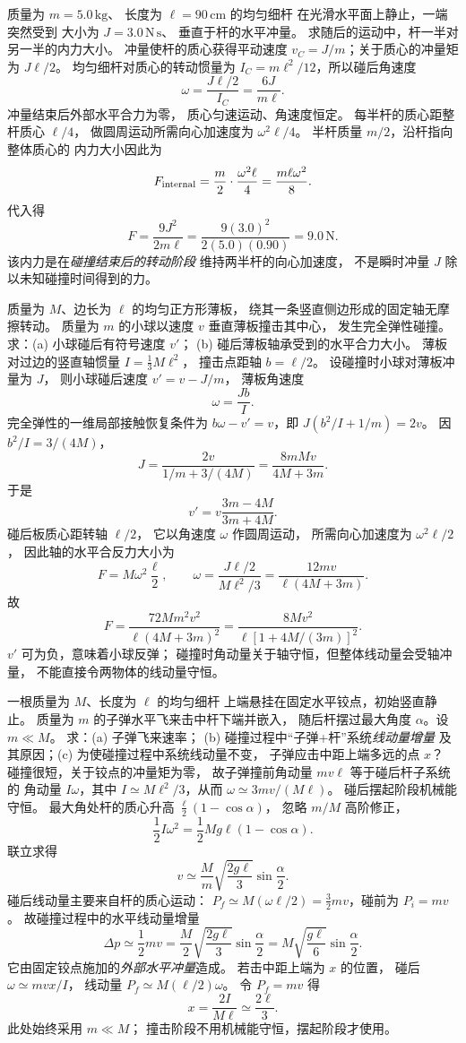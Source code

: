质量为 $m=5.0\,\mathrm{kg}$、
长度为 $\ell=90\,\mathrm{cm}$ 的均匀细杆
在光滑水平面上静止，一端突然受到
大小为 $J=3.0\,\mathrm{N\,s}$、
垂直于杆的水平冲量。
求随后的运动中，杆一半对另一半的内力大小。
\exsolution
冲量使杆的质心获得平动速度
$v_C=J/m$；关于质心的冲量矩为
$J\ell/2$。
均匀细杆对质心的转动惯量为
$I_C=m\ell^2/12$，所以碰后角速度
\[
\omega=\frac{J\ell/2}{I_C}
=\frac{6J}{m\ell}.
\]
冲量结束后外部水平合力为零，
质心匀速运动、角速度恒定。
每半杆的质心距整杆质心 $\ell/4$，
做圆周运动所需向心加速度为
$\omega^2\ell/4$。
半杆质量 $m/2$，沿杆指向整体质心的
内力大小因此为
\[
F_{\rm internal}=\frac m2\cdot\frac{\omega^2\ell}{4}
=\frac{m\ell\omega^2}{8}.
\]
代入得
\[
\boxed{F=\frac{9J^2}{2m\ell}
=\frac{9(3.0)^2}{2(5.0)(0.90)}
=9.0\,\mathrm N}.
\]
\excheck 该内力是在\emph{碰撞结束后的转动阶段}
维持两半杆的向心加速度，
不是瞬时冲量 $J$ 除以未知碰撞时间得到的力。

质量为 $M$、边长为 $\ell$ 的均匀正方形薄板，
绕其一条竖直侧边形成的固定轴无摩擦转动。
质量为 $m$ 的小球以速度 $v$ 垂直薄板撞击其中心，
发生完全弹性碰撞。
求：(a) 小球碰后有符号速度 $v'$；
(b) 碰后薄板轴承受到的水平合力大小。
\exsolution
薄板对过边的竖直轴惯量
$I=\frac13M\ell^2$，
撞击点距轴 $b=\ell/2$。
设碰撞时小球对薄板冲量为 $J$，
则小球碰后速度 $v'=v-J/m$，
薄板角速度
\[
\omega=\frac{Jb}{I}.
\]
完全弹性的一维局部接触恢复条件为
$b\omega-v'=v$，即
$J(b^2/I+1/m)=2v$。
因 $b^2/I=3/(4M)$，
\[
J=\frac{2v}{1/m+3/(4M)}
=\frac{8mMv}{4M+3m}.
\]
于是
\[
\boxed{v'=v\frac{3m-4M}{3m+4M}}.
\]
碰后板质心距转轴 $\ell/2$，
它以角速度 $\omega$ 作圆周运动，
所需向心加速度为 $\omega^2\ell/2$，
因此轴的水平合反力大小为
\[
F=M\omega^2\frac\ell2,\qquad
\omega=\frac{J\ell/2}{M\ell^2/3}
=\frac{12mv}{\ell(4M+3m)}.
\]
故
\[
\boxed{F=\frac{72Mm^2v^2}{\ell(4M+3m)^2}
=\frac{8Mv^2}{\ell[1+4M/(3m)]^2}}.
\]
\excheck $v'$ 可为负，意味着小球反弹；
碰撞时角动量关于轴守恒，但整体线动量会受轴冲量，
不能直接令两物体的线动量守恒。

一根质量为 $M$、长度为 $\ell$ 的均匀细杆
上端悬挂在固定水平铰点，初始竖直静止。
质量为 $m$ 的子弹水平飞来击中杆下端并嵌入，
随后杆摆过最大角度 $\alpha$。设 $m\ll M$。
求：(a) 子弹飞来速率；
(b) 碰撞过程中“子弹+杆”系统\emph{线动量增量}
及其原因；(c) 为使碰撞过程中系统线动量不变，
子弹应击中距上端多远的点 $x$？
\exsolution
碰撞很短，关于铰点的冲量矩为零，
故子弹撞前角动量 $mv\ell$ 等于碰后杆子系统的
角动量 $I\omega$，其中
$I\simeq M\ell^2/3$，从而
$\omega\simeq3mv/(M\ell)$。
碰后摆起阶段机械能守恒。
最大角处杆的质心升高
$\frac\ell2(1-\cos\alpha)$，
忽略 $m/M$ 高阶修正，
\[
\frac12I\omega^2
=\frac12Mg\ell(1-\cos\alpha).
\]
联立求得
\[
\boxed{v\simeq\frac M m
\sqrt{\frac{2g\ell}{3}}\sin\frac\alpha2}.
\]
碰后线动量主要来自杆的质心运动：
$P_f\simeq M(\omega\ell/2)
=\frac32mv$，碰前为 $P_i=mv$。
故碰撞过程中的水平线动量增量
\[
\boxed{\Delta p\simeq\frac12mv
=\frac M2\sqrt{\frac{2g\ell}{3}}\sin\frac\alpha2
=M\sqrt{\frac{g\ell}{6}}\sin\frac\alpha2}.
\]
它由固定铰点施加的\emph{外部水平冲量}造成。
若击中距上端为 $x$ 的位置，
碰后 $\omega\simeq mvx/I$，
线动量 $P_f\simeq M(\ell/2)\omega$。
令 $P_f=mv$ 得
\[
\boxed{x=\frac{2I}{M\ell}\simeq\frac{2\ell}{3}}.
\]
\excheck 此处始终采用 $m\ll M$；
撞击阶段不用机械能守恒，摆起阶段才使用。

